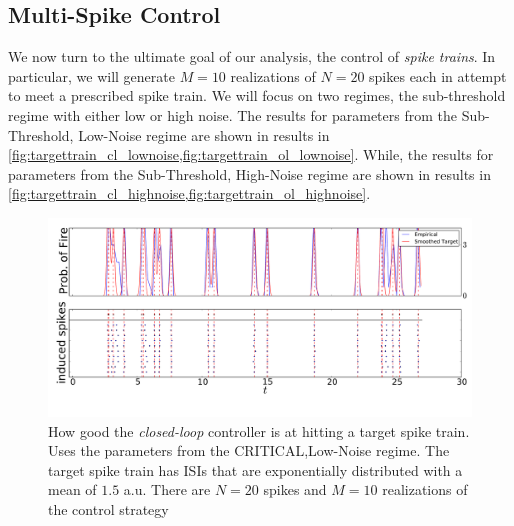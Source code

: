 \documentclass[12pt]{iopart}
\begin{document}
\subsection{Multi-Spike Control}
We now turn to the ultimate goal of our analysis, the control of {\sl spike
trains}. In particular, we will generate $M=10$ realizations of $N=20$ spikes
each in attempt to meet a prescribed spike train. We will focus on two
regimes, the sub-threshold regime with either low or high noise.
The results
for parameters from the Sub-Threshold, Low-Noise regime are shown in
results in \cref{fig:targettrain_cl_lownoise,fig:targettrain_ol_lownoise}.
While, the results
for parameters from the Sub-Threshold, High-Noise regime are shown in
results in \cref{fig:targettrain_cl_highnoise,fig:targettrain_ol_highnoise}.
\begin{figure}[htp]
\begin{center}
  \includegraphics[width=.99\textwidth]{Figs/TrainController/CRITLN_cl_trains_sim_10.pdf}
  \caption[ ]{How good the {\sl closed-loop} controller is at hitting a target
  spike train. Uses the parameters from the CRITICAL,Low-Noise regime. The
  target spike train has ISIs that are exponentially distributed with a
  mean of $1.5$ a.u. There are $N=20$ spikes and $M=10$ realizations of the
  control strategy}
  \label{fig:targettrain_cl_critlownoise}
\end{center}
\end{figure}
\end{document}
